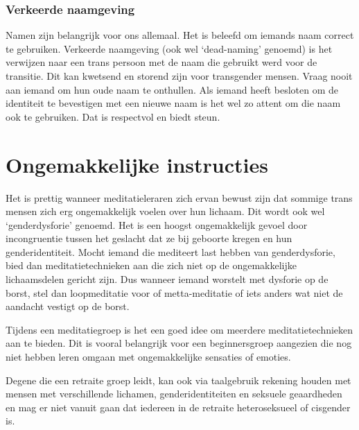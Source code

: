 \documentclass[12pt,openany]{book}
\begin{document}
\subsubsection*{Verkeerde naamgeving}

Namen zijn belangrijk voor ons allemaal. Het is beleefd om iemands naam correct te gebruiken. Verkeerde naamgeving (ook wel `dead-naming' genoemd) is het verwijzen naar een trans persoon met de naam die gebruikt werd voor de transitie. Dit kan kwetsend en storend zijn voor transgender mensen. Vraag nooit aan iemand om hun oude naam te onthullen. Als iemand heeft besloten om de identiteit te bevestigen met een nieuwe naam is het wel zo attent om die naam ook te gebruiken. Dat is respectvol en biedt steun. 

\section*{Ongemakkelijke instructies}

Het is prettig wanneer meditatieleraren zich ervan bewust zijn dat sommige trans mensen zich erg ongemakkelijk voelen over hun lichaam. Dit wordt ook wel `genderdysforie' genoemd. Het is een hoogst ongemakkelijk gevoel door incongruentie tussen het geslacht dat ze bij geboorte kregen en hun genderidentiteit. Mocht iemand die mediteert last hebben van genderdysforie, bied dan meditatietechnieken aan die zich niet op de ongemakkelijke lichaamsdelen gericht zijn. Dus wanneer iemand worstelt met dysforie op de borst, stel dan loopmeditatie voor of metta-meditatie of iets anders wat niet de aandacht vestigt op de borst.

Tijdens een meditatiegroep is het een goed idee om meerdere meditatietechnieken aan te bieden. Dit is vooral belangrijk voor een beginnersgroep aangezien die nog niet hebben leren omgaan met ongemakkelijke sensaties of emoties. 

Degene die een retraite groep leidt, kan ook via taalgebruik rekening houden met mensen met verschillende lichamen, genderidentiteiten en seksuele geaardheden en mag er niet vanuit gaan dat iedereen in de retraite heteroseksueel of cisgender is.
\end{document}
